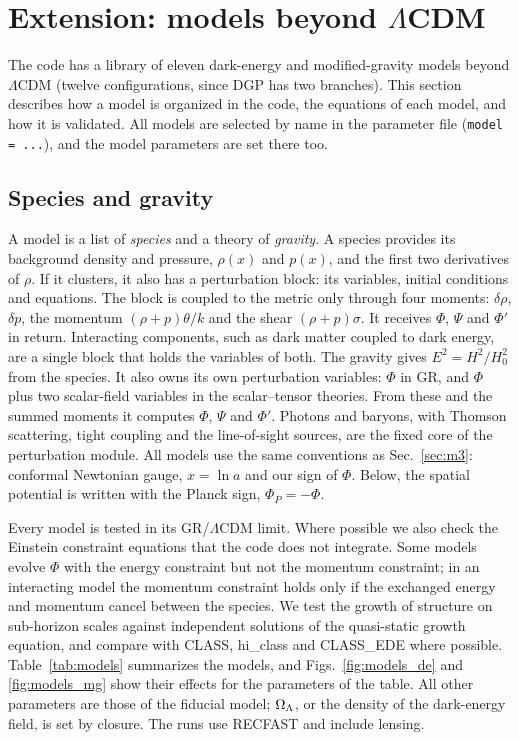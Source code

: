\section{Extension: models beyond $\Lambda$CDM}\label{sec:models}

The code has a library of eleven dark-energy and modified-gravity models beyond $\Lambda$CDM (twelve
configurations, since DGP has two branches). This section describes how
a model is organized in the code, the equations of each model, and how it is validated. All models are selected by
name in the parameter file (\texttt{model = ...}), and the model parameters are set there too.

\subsection{Species and gravity}

A model is a list of \emph{species} and a theory of \emph{gravity}. A species provides its background density and
pressure, $\rho(x)$ and $p(x)$, and the first two derivatives of $\rho$. If it clusters, it also has a perturbation
block: its variables, initial conditions and equations. The block is coupled to the metric only through four
moments: $\delta\rho$, $\delta p$, the momentum $(\rho+p)\theta/k$ and the shear $(\rho+p)\sigma$. It receives
$\Phi$, $\Psi$ and $\Phi'$ in return. Interacting components, such as dark matter coupled to dark energy, are a
single block that holds the variables of both. The gravity gives $E^2=H^2/H_0^2$ from the species. It also owns its
own perturbation variables: $\Phi$ in GR, and $\Phi$ plus two scalar-field variables in the scalar--tensor theories.
From these and the summed moments it computes $\Phi$, $\Psi$ and $\Phi'$. Photons and baryons, with Thomson scattering,
tight coupling and the line-of-sight sources, are the fixed core of the perturbation module. All models use the same
conventions as Sec.~\ref{sec:m3}: conformal Newtonian gauge, $x=\ln a$ and our sign of $\Phi$. Below, the spatial
potential is written with the Planck sign, $\Phi_P=-\Phi$.

Every model is tested in its GR/$\Lambda$CDM limit. Where possible we also check the Einstein constraint equations
that the code does not integrate. Some models evolve $\Phi$ with the energy constraint but not the momentum
constraint; in an interacting model the momentum constraint holds only if the exchanged energy and momentum cancel
between the species. We test the growth of structure on sub-horizon scales against independent solutions of the
quasi-static growth equation, and compare with CLASS, hi\_class and CLASS\_EDE where possible. Table~\ref{tab:models}
summarizes the models, and Figs.~\ref{fig:models_de} and \ref{fig:models_mg} show their effects for the parameters
of the table. All other parameters are those of the fiducial model; $\Omega_\Lambda$, or the density of the dark-energy
field, is set by closure. The runs use RECFAST and include lensing.

